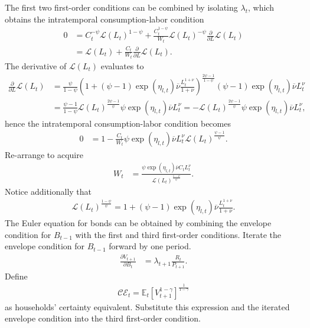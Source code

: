 \documentclass[12 pt, oneside]{article}
\theoremstyle{definition}
\theoremstyle{definition}
\theoremstyle{definition}
\newcommand{\E}{\mathbb{E}}
\newcommand{\calC}{\mathcal{C}}
\newcommand{\calE}{\mathcal{E}}
\newcommand{\calL}{\mathcal{L}}
\begin{document}
The first two first-order conditions can be combined by isolating $\lambda_t$, which obtains the intratemporal consumption-labor condition
\begin{align*}
0 & = C_t^{-\psi}\calL(L_t)^{1 - \psi} + \frac{C_t^{1 - \psi}}{W_t} \calL(L_t)^{-\psi}\frac{\partial}{\partial L}\calL(L_t)\\
  & = \calL(L_t) + \frac{C_t}{W_t}\frac{\partial}{\partial L} \calL(L_t).
\end{align*}
The derivative of $\calL(L_t)$ evaluates to
\begin{align*}
  \frac{\partial}{\partial L}\calL(L_t) & = \frac{\psi}{1 - \psi}\left(1 + (\psi - 1)\exp(\eta_{l, t})\overline{\nu}\frac{L_t^{1 + \nu}}{1 + \nu}\right)^{\frac{2\psi - 1}{1 - \psi}}(\psi - 1)\exp(\eta_{l, t})\overline{\nu}L_t^\nu\\
                                        & = \frac{\psi - 1}{1 - \psi}\calL(L_t)^{\frac{2\psi - 1}{\psi}} \psi\exp(\eta_{l, t})\overline{\nu}L_t^\nu = -\calL(L_t)^{\frac{2\psi - 1}{\psi}} \psi\exp(\eta_{l, t})\overline{\nu}L_t^\nu,
\end{align*}
hence the intratemporal consumption-labor condition becomes
\begin{align*}
  0 & = 1 - \frac{C_t}{W_t}\psi \exp(\eta_{l, t})\overline{\nu}L_t^\nu\calL(L_t)^{\frac{\psi - 1}{\psi}}.
\end{align*}
Re-arrange to acquire
\begin{align}
  W_t & = \frac{\psi \exp(\eta_{l, t})\overline{\nu}C_t L_t^\nu}{\calL(L_t)^{\frac{1 - \psi}{\psi}}}.
\end{align}
Notice additionally that
\begin{align*}
  \calL(L_t)^{\frac{1 - \psi}{\psi}} = 1 + (\psi - 1)\exp(\eta_{l, t})\overline{\nu}\frac{L_t^{1 + \nu}}{1 + \nu}.
\end{align*}
The Euler equation for bonds can be obtained by combining the envelope condition for $B_{t - 1}$ with the first and third first-order conditions. Iterate the envelope condition for $B_{t - 1}$ forward by one period.
\begin{align*}
  \frac{\partial V_{t + 1}}{\partial B_t} & = \lambda_{t + 1}\frac{R_t}{P_{t + 1}}.
\end{align*}
Define
\begin{align}\label{eq:certainty equivalent definition}
\calC\calE_t = \E_t[V_{t + 1}^{1 - \gamma}]^{\frac{1}{1 - \gamma}}
\end{align}
as households' certainty equivalent. Substitute this expression and the iterated envelope condition into the third first-order condition.
\end{document}
